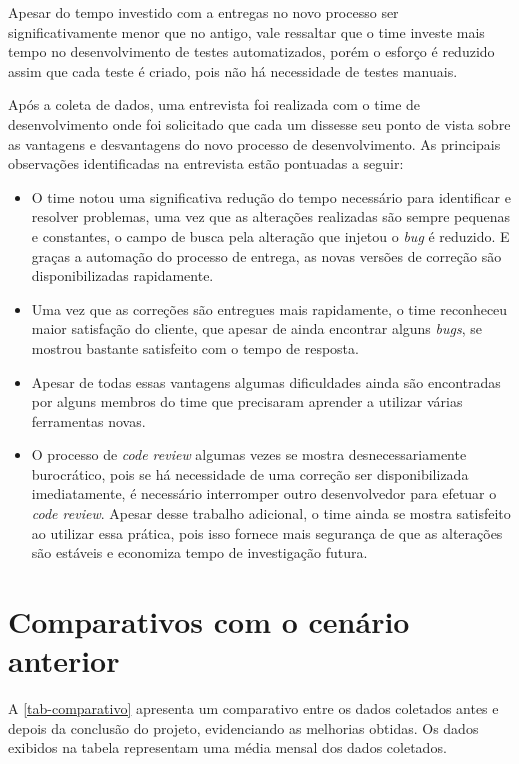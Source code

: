 \documentclass[
12pt,				%
openright,			%
oneside,			%
a4paper,			%
english,			%
french,				%
spanish,			%
brazil,				%
]{abntex2}
\begin{document}
Apesar do tempo investido com a entregas no novo processo ser significativamente menor que no antigo, vale ressaltar que o time investe mais tempo no desenvolvimento de testes automatizados, porém o esforço é reduzido assim que cada teste é criado, pois não há necessidade de testes manuais.

Após a coleta de dados, uma entrevista foi realizada com o time de desenvolvimento onde foi solicitado que cada um dissesse seu ponto de vista sobre as vantagens e desvantagens do novo processo de desenvolvimento. As principais observações identificadas na entrevista estão pontuadas a seguir:

\begin{itemize}  
	\item O time notou uma significativa redução do tempo necessário para identificar e resolver problemas, uma vez que as alterações realizadas são sempre pequenas e constantes, o campo de busca pela alteração que injetou o \textit{bug} é reduzido. E graças a automação do processo de entrega, as novas versões de correção são disponibilizadas rapidamente. 
	\item Uma vez que as correções são entregues mais rapidamente, o time reconheceu maior satisfação do cliente, que apesar de ainda encontrar alguns \textit{bugs}, se mostrou bastante satisfeito com o tempo de resposta.
	\item Apesar de todas essas vantagens algumas dificuldades ainda são encontradas por alguns membros do time que precisaram aprender a utilizar várias ferramentas novas.
	\item O processo de \textit{code review} algumas vezes se mostra desnecessariamente burocrático, pois se há necessidade de uma correção ser disponibilizada imediatamente, é necessário interromper outro desenvolvedor para efetuar o \textit{code review}. Apesar desse trabalho adicional, o time ainda se mostra satisfeito ao utilizar essa prática, pois isso fornece mais segurança de que as alterações são estáveis e economiza tempo de investigação futura.
\end{itemize}

\section{Comparativos com o cenário anterior}

A \autoref{tab-comparativo} apresenta um comparativo entre os dados coletados antes e depois da conclusão do projeto, evidenciando as melhorias obtidas. Os dados exibidos na tabela representam uma média mensal dos dados coletados.
\end{document}
